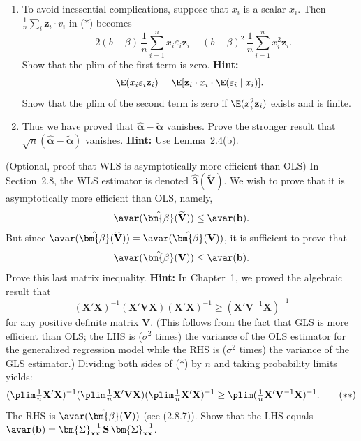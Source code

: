 \begin{problemset}
\begin{enumerate}[label=(\alph*)]
\item To avoid inessential complications, suppose that $x_i$ is a scalar $x_i$. Then
$\frac{1}{n}\sum_i \mathbf{z}_i \cdot v_i$ in ($*$) becomes
\[
-2(b - \beta)\,\frac{1}{n}\sum_{i=1}^{n}x_i\varepsilon_i\mathbf{z}_i
+ (b - \beta)^2\,\frac{1}{n}\sum_{i=1}^{n}x_i^2\mathbf{z}_i.
\tag{$**$}
\]
Show that the plim of the first term is zero. \textbf{Hint:}
\[
\E(x_i\varepsilon_i\mathbf{z}_i) = \E[\mathbf{z}_i \cdot x_i \cdot \E(\varepsilon_i \mid x_i)].
\]
Show that the plim of the second term is zero if $\E(x_i^2\mathbf{z}_i)$ exists and is finite.

\item Thus we have proved that $\hat{\bm{\alpha}} - \tilde{\bm{\alpha}}$ vanishes. Prove the stronger result that
$\sqrt{n}(\hat{\bm{\alpha}} - \tilde{\bm{\alpha}})$ vanishes. \textbf{Hint:} Use Lemma~2.4(b).
\end{enumerate}

\exercise[7] (Optional, proof that WLS is asymptotically more efficient than OLS)\quad
In Section~2.8, the WLS estimator is denoted $\hat{\bm{\beta}}(\widetilde{\mathbf{V}})$.
We wish to prove that it is asymptotically more efficient than OLS, namely,
\[
\avar(\hat{\bm{\beta}}(\widetilde{\mathbf{V}})) \leq \avar(\mathbf{b}).
\]
But since $\avar(\hat{\bm{\beta}}(\widetilde{\mathbf{V}})) = \avar(\hat{\bm{\beta}}(\mathbf{V}))$,
it is sufficient to prove that
\[
\avar(\hat{\bm{\beta}}(\mathbf{V})) \leq \avar(\mathbf{b}).
\]
Prove this last matrix inequality. \textbf{Hint:} In Chapter~1, we proved the algebraic
result that
\[
(\mathbf{X}'\mathbf{X})^{-1}(\mathbf{X}'\mathbf{V}\mathbf{X})(\mathbf{X}'\mathbf{X})^{-1}
\geq (\mathbf{X}'\mathbf{V}^{-1}\mathbf{X})^{-1}
\tag{$*$}
\]
for any positive definite matrix $\mathbf{V}$. (This follows from the fact that GLS is more
efficient than OLS; the LHS is ($\sigma^2$ times) the variance of the OLS estimator for
the generalized regression model while the RHS is ($\sigma^2$ times) the variance of
the GLS estimator.) Dividing both sides of ($*$) by $n$ and taking probability limits
yields:
\[
(\plim \tfrac{1}{n}\mathbf{X}'\mathbf{X})^{-1}
(\plim \tfrac{1}{n}\mathbf{X}'\mathbf{V}\mathbf{X})
(\plim \tfrac{1}{n}\mathbf{X}'\mathbf{X})^{-1}
\geq \plim(\tfrac{1}{n}\mathbf{X}'\mathbf{V}^{-1}\mathbf{X})^{-1}.
\tag{$**$}
\]
The RHS is $\avar(\hat{\bm{\beta}}(\mathbf{V}))$ (see (2.8.7)). Show that the LHS equals
$\avar(\mathbf{b}) = \bm{\Sigma}_{\mathbf{xx}}^{-1}\,\mathbf{S}\,\bm{\Sigma}_{\mathbf{xx}}^{-1}$.


\end{problemset}
